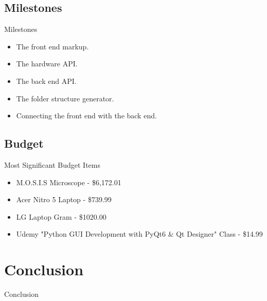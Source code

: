 \documentclass[14pt, aspectratio=169]{beamer}
\begin{document}
\subsection{Milestones}
\begin{frame}{Milestones}
	\begin{itemize}
		\item The front end markup.
		\item The hardware API.
		\item The back end API.
		\item The folder structure generator.
		\item Connecting the front end with the back end.
	\end{itemize}
\end{frame}
\subsection{Budget}
\begin{frame}{Most Significant Budget Items}
	\begin{itemize}
		\item M.O.S.I.S Microscope - \$6,172.01
		\item Acer Nitro 5 Laptop - \$739.99 
		\item LG Laptop Gram - \$1020.00 
        \item Udemy "Python GUI Development with PyQt6 \& Qt Designer" Class - \$14.99 
	\end{itemize}
\end{frame}
\section{Conclusion}
\begin{frame}{Conclusion}

\end{frame}
\end{document}
